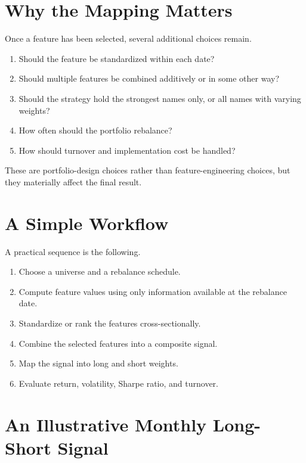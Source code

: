 \documentclass[11pt]{article}
\begin{document}
\newpage

\section*{Why the Mapping Matters}

Once a feature has been selected, several additional choices remain.

\begin{enumerate}
  \item Should the feature be standardized within each date?
  \item Should multiple features be combined additively or in some other way?
  \item Should the strategy hold the strongest names only, or all names with varying weights?
  \item How often should the portfolio rebalance?
  \item How should turnover and implementation cost be handled?
\end{enumerate}

These are portfolio-design choices rather than feature-engineering choices, but
they materially affect the final result.

\section*{A Simple Workflow}

A practical sequence is the following.

\begin{enumerate}
  \item Choose a universe and a rebalance schedule.
  \item Compute feature values using only information available at the rebalance date.
  \item Standardize or rank the features cross-sectionally.
  \item Combine the selected features into a composite signal.
  \item Map the signal into long and short weights.
  \item Evaluate return, volatility, Sharpe ratio, and turnover.
\end{enumerate}

\newpage

\section*{An Illustrative Monthly Long-Short Signal}
\end{document}
